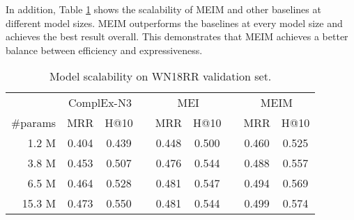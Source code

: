 \documentclass{article}
\theoremstyle{plain}
\theoremstyle{remark}
\begin{document}
In addition, Table \ref{tab:param_scale} shows the scalability of MEIM and other baselines at different model sizes. MEIM outperforms the baselines at every model size and achieves the best result overall. This demonstrates that MEIM achieves a better balance between efficiency and expressiveness.

\begin{table}[t]
	\centering  
	\begin{adjustbox}{max width=\linewidth}
		\begin{tabular}{@{\extracolsep{-4pt}}rcclcclcc}


			& \multicolumn{2}{c}{ComplEx-N3} && \multicolumn{2}{c}{MEI} && \multicolumn{2}{c}{MEIM} \\
			\cmidrule{2-3} \cmidrule{5-6} \cmidrule{8-9}
			\#params & MRR & H@10 && MRR & H@10 && MRR & H@10 \\
			\cmidrule{1-3} \cmidrule{5-6} \cmidrule{8-9}
			
			1.2 M & 0.404 & 0.439 && 0.448 & 0.500 && 0.460 & 0.525 \\ 3.8 M & 0.453 & 0.507 && 0.476 & 0.544 && 0.488 & 0.557 \\ 6.5 M & 0.464 & 0.528 && 0.481 & 0.547 && 0.494 & 0.569 \\ 15.3 M & 0.473 & 0.550 && 0.481 & 0.544 && 0.499 & 0.574 \\ 

\end{tabular}
	\end{adjustbox}
	\caption[]{Model scalability on WN18RR validation set.}
	\label{tab:param_scale}
\end{table}
\end{document}
